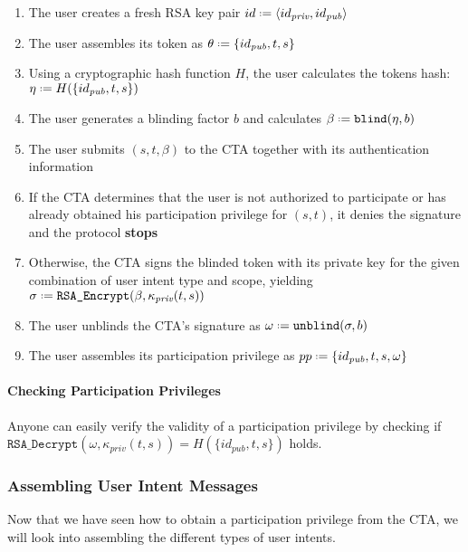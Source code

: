 %

\begin{enumerate}
\item The user creates a fresh RSA key pair $id \defeq \langle id_{\textit{priv}}, id_{\textit{pub}} \rangle$
\item The user assembles its token as $\theta \defeq \{id_{\textit{pub}}, t, s\} $
\item Using a cryptographic hash function $H$, the user calculates the tokens hash: $\eta \defeq H(\{id_{\textit{pub}}, t, s\})$
\item The user generates a blinding factor  $b$ and calculates $\beta \defeq \texttt{blind}(\eta, b)$
\item The user submits $(s, t, \beta)$ to the CTA together with its authentication information
\item If the CTA determines that the user is not authorized to participate or has already obtained his participation privilege for $(s,t)$, it denies the signature and the protocol \textbf{stops}
\item Otherwise, the CTA signs the blinded token with its private key for the given combination of user intent type and scope, yielding $\sigma\defeq \texttt{RSA\_Encrypt}(\beta,  \kappa_\textit{priv}(t,s))$
\item The user unblinds the CTA's signature as $\omega \defeq \texttt{unblind}(\sigma, b)$
\item The user assembles its participation privilege as $pp \defeq \{id_{\textit{pub}}, t, s, \omega\}$
\end{enumerate}

\paragraph{Checking Participation Privileges}
Anyone can easily verify the validity of a participation privilege by checking if $\texttt{RSA\_Decrypt}(\omega,  \kappa_\textit{priv}(t,s)) = H(\{id_{\textit{pub}}, t, s\})$ holds.

\subsubsection{Assembling User Intent Messages}
Now that we have seen how to obtain a participation privilege from the CTA, we will look into assembling the different types of user intents.

